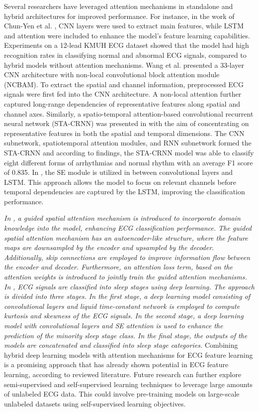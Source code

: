 \documentclass[preprint,12pt]{elsarticle}
\begin{document}
Several researchers have leveraged attention mechanisms in standalone and hybrid architectures for improved performance. For instance, in the work of Chun-Yen et al. \citep{chen_automated_2022}, CNN layers were used to extract main features, while LSTM and attention were included to enhance the model's feature learning capabilities. Experiments on a 12-lead KMUH ECG dataset showed that the model had high recognition rates in classifying normal and abnormal ECG signals, compared to hybrid models without attention mechanisms. Wang et al. \citep{wang_automated_2021} presented a 33-layer CNN architecture with non-local convolutional block attention module (NCBAM). To extract the spatial and channel information, preprocessed ECG signals were first fed into the CNN architecture. A non-local attention further captured long-range dependencies of representative features along spatial and channel axes. Similarly, a spatio-temporal attention-based convolutional recurrent neural network (STA-CRNN) was presented in \citep{zhang_ecg-based_2020} with the aim of concentrating on representative features in both the spatial and temporal dimensions. The CNN subnetwork, spatiotemporal attention modules, and RNN subnetwork formed the STA-CRNN and according to findings, the STA-CRNN model was able to classify eight different forms of arrhythmias and normal rhythm with an average F1 score of 0.835. In \citep{sun_arrhythmia_2024}, the SE module is utilized in between convolutional layers and LSTM. This approach allows the model to focus on relevant channels before temporal dependencies are captured by the LSTM, improving the classification performance.

\emph{In \citep{huang_ecg_2024}, a guided spatial attention mechanism is introduced to incorporate domain knowledge into the model, enhancing ECG classification performance. The guided spatial attention mechanism has an autoencoder-like structure, where the feature maps are downsampled by the encoder and upsampled by the decoder. Additionally, skip connections are employed to improve information flow between the encoder and decoder. Furthermore, an attention loss term, based on the attention weights is introduced to jointly train the guided attention mechanisms.} \emph{In \citep{aghaomidi_ecg-sleepnet_2024}, ECG signals are classified into sleep stages using deep learning. The approach is divided into three stages. In the first stage, a deep learning model consisting of convolutional layers and liquid time-constant network \citep{hasani_liquid_2021} is employed to compute kurtosis and skewness of the ECG signals. In the second stage, a deep learning model with convolutional layers and SE attention is used to enhance the prediction of the minority sleep stage class. In the final stage, the outputs of the models are concatenated and classified into sleep stage categories.} Combining hybrid deep learning models with attention mechanisms for ECG feature learning is a promising approach that has already shown potential in ECG feature learning, according to reviewed literature. Future research can further explore semi-supervised and self-supervised learning techniques to leverage large amounts of unlabeled ECG data. This could involve pre-training models on large-scale unlabeled datasets using self-supervised learning objectives. 
\end{document}
